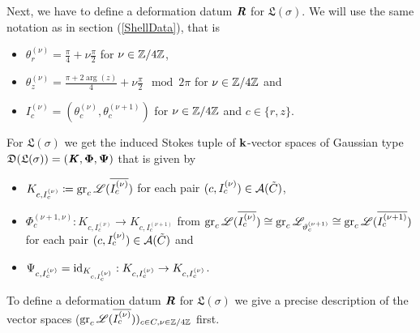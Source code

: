Next, we have to define a deformation datum $\bm{\mathit{R}}$ for $\mathfrak{L}(\sigma)$. We will use the same notation as in section (\ref{ShellData}), that is 
\begin{itemize}
    \item $\theta_r^{(\nu)} = \frac{\pi}{4}+\nu\frac{\pi}{2}$ for $\nu \in \mathbb{Z}/4\mathbb{Z}$,
    \item $\theta_z^{(\nu)} = \frac{\pi+2\arg(z)}{4}+\nu\frac{\pi}{2} \mod 2\pi$ for $\nu \in \mathbb{Z}/4\mathbb{Z}$ and 
    \item $I_c^{(\nu)} = (\theta_c^{(\nu)}, \theta_c^{(\nu+1)})$ for $\nu \in \mathbb{Z}/4\mathbb{Z}$ and $c \in \{r,z\}$.
\end{itemize} For $\mathfrak{L}(\sigma)$ we get the induced Stokes tuple of $\mathbf{k}$-vector spaces of Gaussian type $\mathfrak{D}(\mathfrak{L}(\sigma)) =(\bm{\mathit{K}},\bm\Phi,\bm\Psi)$ that is given by
\begin{itemize}
    \item $K_{c,I_c^{(\nu)}} \coloneqq \operatorname{gr}_c\mathscr{L}(\overline{I_c^{(\nu)}})$ for each pair $(c,I_c^{(\nu)})\in \mathcal{A}(\tilde{C})$,
    \item $\Phi_c^{(\nu+1,\nu)}:K_{c, I^{(\nu)}_c} \to K_{c,I^{(\nu+1)}_c}$ from $\operatorname{gr}_c\mathscr{L}(\overline{I^{(\nu)}_c}) \cong \operatorname{gr}_c\mathscr{L}_{\vartheta_c^{(\nu+1)}} \cong \operatorname{gr}_c\mathscr{L}(\overline{I_c^{(\nu+1)}})$ for each pair $(c,I_c^{(\nu)}) \in \mathcal{A}(\tilde{C})$ and
    \item $\Psi_{c,I_c^{(\nu)}} = \operatorname{id}_{K_{c,I_c^{(\nu)}}}:K_{c,I_c^{(\nu)}} \to K_{c,I_c^{(\nu)}}$.
\end{itemize}

To define a deformation datum $\bm{\mathit{R}}$ for $\mathfrak{L}(\sigma)$ we give a precise description of the vector spaces ($\operatorname{gr}_c\mathscr{L}(\overline{I_c^{(\nu)}}))_{c \in C, \nu \in \mathbb{Z}/4\mathbb{Z}}$ first. 
\begin{comment}
Writing $S^{(\nu+1,\nu)} = (S_{c_1c_2}^{(\nu+1,\nu)}:G_{c_2}^{(\nu)} \to G_{c_1}^{(\nu+1)})_{c_1,c_2 \in C}$, then for $r \in C$ we get 
\[
\gr_r\Lo(\overline{I_r^{(0)}}) = \left\{(s_{\nu}) \in \prod_{\nu =1}^3 \gr_r\Lo_{\overline{I^{(\nu)}}}(\overline{I_r^{(0)}}\cap I^{(\nu)}_{\epsilon}) \mid S_{rr}^{(\nu+1,\nu)} ([s_\nu]) = [s_{\nu+1}] \text{ for all } \nu \in \Z/4\Z\right\}
\]
where 

\begin{align*} [s_{\nu}] & \coloneqq s_\nu\vert_{\overline{I_r^{(0)}} \cap \overline{I^{(\nu)}} \cap \overline{I^{(\nu+1)}}} \in \begin{cases} 0 &\text{ if } \theta_{\nu+1} \not\in \overline{I_r^{(0)}} \\
(\gr_c\Lo_{I^{(\nu)}})_{\theta_{\nu+1}} = G_c^{(\nu)} &\text{ if } \theta_{\nu+1} \in \overline{I_r^{(0)}}
\end{cases} \text{ and } \\
[s_{\nu+1}] & \coloneqq s_{\nu+1}\vert_{\overline{I_r^{(0)}} \cap \overline{I^{(\nu)}} \cap \overline{I^{(\nu+1)}}} \in \begin{cases} 0 &\text{ if } \theta_{\nu+1} \not\in \overline{I_r^{(0)}} \\
(\gr_c\Lo_{I^{(\nu+1)}})_{\theta_{\nu+1}} = G_c^{(\nu+1)} &\text{ if } \theta_{\nu+1} \in \overline{I_r^{(0)}}
\end{cases}.
\end{align*}
\end{comment}


